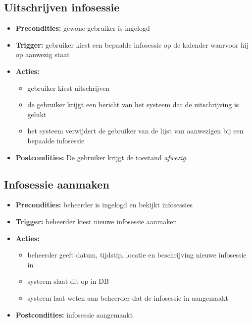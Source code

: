 \documentclass[]{article}
\begin{document}
\subsection{Uitschrijven infosessie}
\begin{itemize}

\item \textbf{Precondities:} gewone gebruiker is ingelogd
\item \textbf{Trigger:} gebruiker kiest een bepaalde infosessie op de kalender waarvoor hij op aanwezig staat 
\item \textbf{Acties:} \begin{itemize}
\item	gebruiker kiest uitschrijven
\item	de gebruiker krijgt een bericht van het systeem dat de uitschrijving is gelukt
\item	het systeem verwijdert de gebruiker van de lijst van aanwezigen bij een bepaalde infosessie
\end{itemize}
\item \textbf{Postcondities:} De gebruiker krijgt de toestand \emph{afwezig}.
\end{itemize}


\subsection{Infosessie aanmaken}
\begin{itemize}
\item \textbf{Precondities:} beheerder is ingelogd en bekijkt infosessies
\item \textbf{Trigger:} beheerder kiest nieuwe infosessie aanmaken
\item \textbf{Acties:} \begin{itemize}
\item	beheerder geeft datum, tijdstip, locatie en beschrijving nieuwe infosessie in
\item 	systeem slaat dit op in DB
\item	systeem laat weten aan beheerder dat de infosessie in aangemaakt
\end{itemize}
\item \textbf{Postcondities:} infosessie aangemaakt
\end{itemize}
\end{document}
